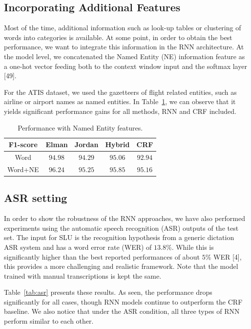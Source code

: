 \subsection{Incorporating Additional Features}

Most of the time, additional information such as look-up tables or clustering
of words into categories is available. At some point, in order to obtain the
best performance, we want to integrate this information in the RNN
architecture. At the model level, we concatenated the Named Entity (NE)
information feature as a one-hot vector feeding both to the context window
input and the softmax layer [49]. 

For the ATIS dataset, we used the gazetteers of flight related entities, such
as airline or airport names as named entities. In Table~\ref{tab:ne}, we can observe that
it yields significant performance gains for all methods, RNN and CRF included.

\begin{table}
\centering
\begin{tabular}{|c|c|c|c|c|}
\hline
F1-score &   Elman &  Jordan &  Hybrid & CRF \\
\hline
Word    & $94.98$ &  $94.29$ &  $95.06$ &  $92.94$ \\
Word+NE & $96.24$ &  $95.25$ &  $95.85$ &  $95.16$ \\
\hline
\end{tabular}
\caption{Performance with Named Entity features.}
\label{tab:ne}
\end{table}

\subsection{ASR setting}

In order to show the robustness of the RNN approaches, we have also performed
experiments using the automatic speech recognition (ASR) outputs of the test
set. The input for SLU is the recognition hypothesis from a generic dictation
ASR system and has a word error rate (WER) of $13.8\%$. While this is
significantly higher than the best reported performances of about $5\%$ WER [4],
this provides a more challenging and realistic framework. Note that the model
trained with manual transcriptions is kept the same.


Table~\ref{tab:asr} presents these results. As seen, the performance drops significantly
for all cases, though RNN models continue to outperform the CRF baseline. We
also notice that under the ASR condition, all three types of RNN perform
similar to each other.

